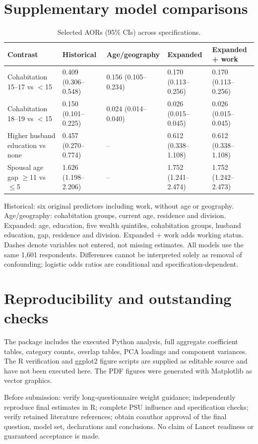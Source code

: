 \documentclass[11pt]{article}
\begin{document}
\section{Supplementary model comparisons}
\begin{table}[htbp]\centering\scriptsize\setlength{\tabcolsep}{3pt}
\caption{Selected AORs (95\% CIs) across specifications.}\label{tab:sensitivity}
\begin{tabular}{p{.27\linewidth}p{.16\linewidth}p{.16\linewidth}p{.16\linewidth}p{.16\linewidth}}
\toprule Contrast & Historical & Age/geography & Expanded & Expanded + work\\\midrule
Cohabitation 15--17 vs $<$15 & 0.409 (0.306--0.548) & 0.156 (0.105--0.234) & 0.170 (0.113--0.256) & 0.170 (0.113--0.256) \\
Cohabitation 18--19 vs $<$15 & 0.150 (0.101--0.225) & 0.024 (0.014--0.040) & 0.026 (0.015--0.045) & 0.026 (0.015--0.045) \\
Higher husband education vs none & 0.457 (0.270--0.774) & -- & 0.612 (0.338--1.108) & 0.612 (0.338--1.108) \\
Spousal age gap $\geq$11 vs $\leq$5 & 1.626 (1.198--2.206) & -- & 1.752 (1.241--2.474) & 1.752 (1.242--2.473) \\

\bottomrule\end{tabular}
\end{table}
Historical: six original predictors including work, without age or geography. Age/geography: cohabitation groups, current age, residence and division. Expanded: age, education, five wealth quintiles, cohabitation groups, husband education, gap, residence and division. Expanded + work adds working status. Dashes denote variables not entered, not missing estimates. All models use the same 1,601 respondents. Differences cannot be interpreted solely as removal of confounding; logistic odds ratios are conditional and specification-dependent.

\section{Reproducibility and outstanding checks}
The package includes the executed Python analysis, full aggregate coefficient tables, category counts, overlap tables, PCA loadings and component variances. The R verification and ggplot2 figure scripts are supplied as editable source and have not been executed here. The PDF figures were generated with Matplotlib as vector graphics.

Before submission: verify long-questionnaire weight guidance; independently reproduce final estimates in R; complete PSU influence and specification checks; verify retained literature references; obtain coauthor approval of the final question, model set, declarations and conclusions. No claim of Lancet readiness or guaranteed acceptance is made.
\end{document}
